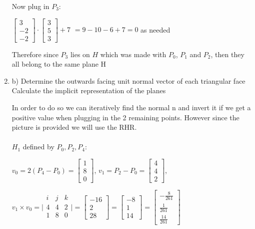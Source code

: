 \documentclass{article}
\begin{document}
\begin{enumerate}
        Now plug in $P_3$:

        $\begin{bmatrix} 3 \\ -2 \\ -2 \end{bmatrix} \cdot \begin{bmatrix} 3 \\ 5 \\ 3 \end{bmatrix} + 7 $
        $ = 9 - 10 - 6 + 7 = 0$ as needed
        
        Therefore since $P_3$ lies on $H$ which was made with $P_0$, $P_1$ and $P_2$, then they all belong to the same plane H

        \item b) Determine the outwards facing unit normal vector of each triangular face Calculate the implicit representation of the planes
        
        In order to do so we can iteratively find the normal n and invert it if we get a positive value when plugging in the 2 remaining points.
        However since the picture is provided we will use the RHR.        
        
        



        \paragraph{} $H_1$ defined by $P_0,P_2,P_4$:

        $v_0 = 2(P_4 - P_0) = \begin{bmatrix} 1 \\ 8 \\ 0 \end{bmatrix}$,
        $v_1 = P_2 - P_0 = \begin{bmatrix} 4  \\ 4 \\ 2 \end{bmatrix}$,

        $ v_1 \times v_0 = \Bigg | \begin{matrix}
            i & j & k \\
            4  & 4 & 2 \\
            1 & 8 & 0 \\
        \end{matrix} \Bigg | = \begin{bmatrix}  -16 \\ 2 \\ 28 \end{bmatrix} = \begin{bmatrix}  - 8 \\ 1 \\ 14 \end{bmatrix} = \begin{bmatrix}  - \frac{8}{261} \\ \frac{1}{261} \\ \frac{14}{261} \end{bmatrix}$


\end{enumerate}
\end{document}
